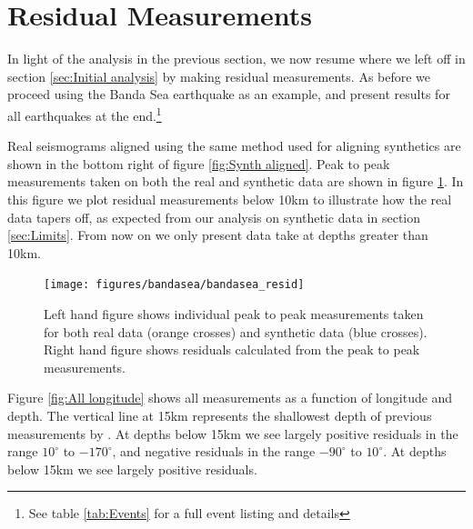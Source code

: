 \documentclass[11pt,a4paper]{article}
\begin{document}
\section{Residual Measurements}
\label{sec:Resid measurements}

In light of the analysis in the previous section, we now resume where we left off in section \ref{sec:Initial analysis} by making residual measurements. As before we proceed using the Banda Sea earthquake as an example, and present results for all earthquakes at the end.\footnote{See table \ref{tab:Events} for a full event listing and details}

Real seismograms aligned using the same method used for aligning synthetics are shown in the bottom right of figure \ref{fig:Synth aligned}. Peak to peak measurements taken on both the real and synthetic data are shown in figure \ref{fig:Bandasea residuals}. In this figure we plot residual measurements below 10km to illustrate how the real data tapers off, as expected from our analysis on synthetic data in section \ref{sec:Limits}. From now on we only present data take at depths greater than 10km.

\begin{figure}
	\centering
	\texttt{[image: figures/bandasea/bandasea\_resid]}
	\caption{Left hand figure shows individual peak to peak measurements taken for both real data (orange crosses) and synthetic data (blue crosses). Right hand figure shows residuals calculated from the peak to peak measurements.}
	\label{fig:Bandasea residuals}
\end{figure}

Figure \ref{fig:All longitude} shows all measurements as a function of longitude and depth. The vertical line at 15km represents the shallowest depth of previous measurements by \cite{Waszek2011a}. At depths below 15km we see largely positive residuals in the range $10^{\circ}$ to $-170^{\circ}$, and negative residuals in the range $-90^{\circ}$ to $10^{\circ}$. At depths below 15km we see largely positive residuals.
\end{document}
